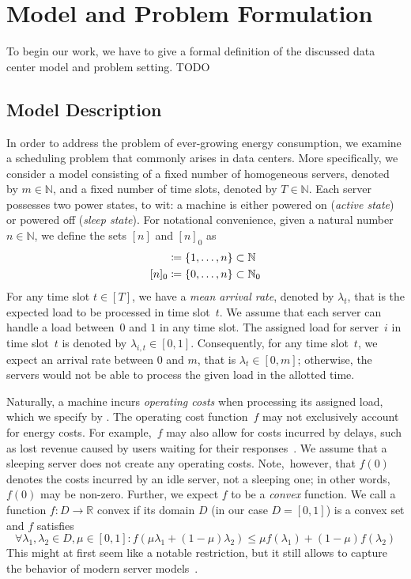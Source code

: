 
\chapter{Model and Problem Formulation}
To begin our work, we have to give a formal definition of the discussed data center model and problem setting.
TODO

\section{Model Description}\label{sec:model_descr}
In order to address the problem of ever-growing energy consumption, we examine a scheduling problem that commonly arises in data centers. More specifically, we consider a model consisting of a fixed number of homogeneous servers, denoted by $m\in\mathbb{N}$, and a fixed number of time slots, denoted by $T\in\mathbb{N}$. Each server possesses two power states, to wit: a machine is either powered on (\emph{active state}) or powered off (\emph{sleep state}). For notational convenience, given a natural number $n\in\mathbb{N}$, we define the sets $[n]$ and $[n]_0$ as
\begin{align*}
	[n]&\coloneqq\fromto{1}{n}\subset\mathbb{N}\\
	[n]_0&\coloneqq\fromto{0}{n}\subset\mathbb{N}_0
\end{align*}
For any time slot $t\in[T]$, we have a \emph{mean arrival rate}, denoted by $\lambda_t$, that is the expected load to be processed in time slot~$t$. We assume that each server can handle a load between~$0$ and $1$ in any time slot. The assigned load for server~$i$ in time slot~$t$ is denoted by $\lambda_{i,t}\in[0,1]$. Consequently, for any time slot~$t$, we expect an arrival rate between $0$ and $m$, that is $\lambda_t\in[0,m]$; otherwise, the servers would not be able to process the given load in the allotted time.

Naturally, a machine incurs \emph{operating costs} when processing its assigned load, which we specify by . The operating cost function~$f$ may not exclusively account for energy costs. For example,~$f$ may also allow for costs incurred by delays, such as lost revenue caused by users waiting for their responses~\parencite{dyn-right-sizing}\parencite{geo-load-balancing}. We assume that a sleeping server does not create any operating costs. Note,~however, that $f(0)$ denotes the costs incurred by an idle server, not a sleeping one; in other words, $f(0)$ may be non-zero. Further, we expect $f$ to be a \emph{convex} function. We call a function $f:D\rightarrow\mathbb{R}$ convex if its domain $D$ (in our case $D=[0,1]$) is a convex set and $f$ satisfies
\begin{equation}\label{eq:convex_condition}
	\forall \lambda_1,\lambda_2\in D,\mu\in[0,1]:f(\mu\lambda_1+(1-\mu)\lambda_2)\le\mu f(\lambda_1)+(1-\mu)f(\lambda_2)
\end{equation}
This might at first seem like a notable restriction, but it still allows to capture the behavior of modern server models~\parencite{bansal-soco}\parencite{dyn-right-sizing}.

